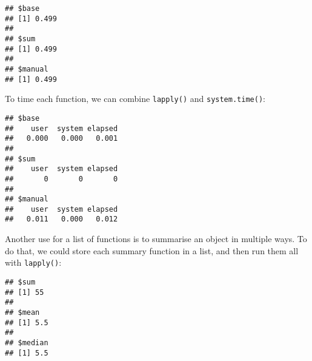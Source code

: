 \begin{Shaded}
\begin{Highlighting}[]
\StringTok{ }
\end{Highlighting}
\end{Shaded}

\begin{verbatim}
## $base
## [1] 0.499
## 
## $sum
## [1] 0.499
## 
## $manual
## [1] 0.499
\end{verbatim}

To time each function, we can combine \texttt{lapply()} and
\texttt{system.time()}:

\begin{Shaded}
\begin{Highlighting}[]
\NormalTok{(}
\end{Highlighting}
\end{Shaded}

\begin{verbatim}
## $base
##    user  system elapsed 
##   0.000   0.000   0.001 
## 
## $sum
##    user  system elapsed 
##       0       0       0 
## 
## $manual
##    user  system elapsed 
##   0.011   0.000   0.012
\end{verbatim}

Another use for a list of functions is to summarise an object in
multiple ways. To do that, we could store each summary function in a
list, and then run them all with \texttt{lapply()}:

\begin{Shaded}
\begin{Highlighting}[]
\StringTok{ }\OperatorTok{:}
\StringTok{ }\NormalTok{(}
\NormalTok{)}
\end{Highlighting}
\end{Shaded}

\begin{verbatim}
## $sum
## [1] 55
## 
## $mean
## [1] 5.5
## 
## $median
## [1] 5.5
\end{verbatim}

